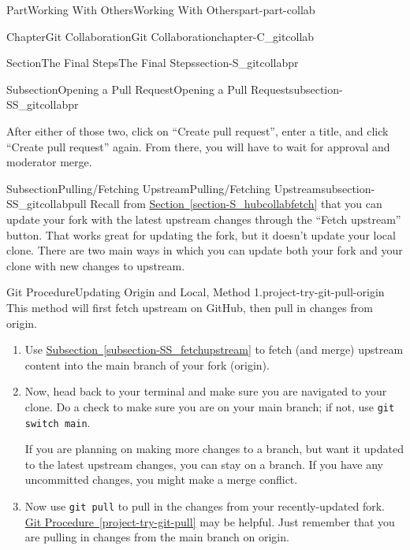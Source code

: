 \documentclass[oneside,10pt,]{book}
\newcommand{\xreffont}{\relax}
\newcommand{\mono}[1]{\texttt{#1}}
\begin{document}
\begin{partptx}{Part}{Working With Others}{}{Working With Others}{}{}{part-part-collab}
\begin{chapterptx}{Chapter}{Git Collaboration}{}{Git Collaboration}{}{}{chapter-C_gitcollab}
\begin{sectionptx}{Section}{The Final Steps}{}{The Final Steps}{}{}{section-S_gitcollabpr}
\begin{subsectionptx}{Subsection}{Opening a Pull Request}{}{Opening a Pull Request}{}{}{subsection-SS_gitcollabpr}
\begin{enumerate}
\end{enumerate}
%
\par
After either of those two, click on ``Create pull request'', enter a title, and click ``Create pull request'' again. From there, you will have to wait for approval and moderator merge.%
\end{subsectionptx}
%
%
\typeout{************************************************}
\typeout{************************************************}
%
\begin{subsectionptx}{Subsection}{Pulling\slash{}Fetching Upstream}{}{Pulling\slash{}Fetching Upstream}{}{}{subsection-SS_gitcollabpull}
%
%
%
%
%
Recall from \hyperref[section-S_hubcollabfetch]{Section~{\xreffont\ref{section-S_hubcollabfetch}}} that you can update your fork with the latest upstream changes through the ``Fetch upstream'' button. That works great for updating the fork, but it doesn't update your local clone. There are two main ways in which you can update both your fork and your clone with new changes to upstream.%
\begin{project}{Git Procedure}{Updating Origin and Local, Method 1.}{project-try-git-pull-origin}%
%
%
%
%
This method will first fetch upstream on GitHub, then pull in changes from origin.%
\begin{enumerate}[font=\bfseries,label=(\alph*),ref=\alph*]%
\item{}Use \hyperref[subsection-SS_fetchupstream]{Subsection~{\xreffont\ref{subsection-SS_fetchupstream}}} to fetch (and merge) upstream content into the main branch of your fork (origin).%
\item{}Now, head back to your terminal and make sure you are navigated to your clone. Do a check to make sure you are on your main branch; if not, use \mono{git switch main}.%
\par
If you are planning on making more changes to a branch, but want it updated to the latest upstream changes, you can stay on a branch. If you have any uncommitted changes, you might make a merge conflict.%
\item{}Now use \mono{git pull} to pull in the changes from your recently-updated fork. \hyperref[project-try-git-pull]{Git Procedure~{\xreffont\ref{project-try-git-pull}}} may be helpful. Just remember that you are pulling in changes from the main branch on origin.%
\end{enumerate}%

\end{project}
\end{subsectionptx}
\end{sectionptx}
\end{chapterptx}
\end{partptx}
\end{document}
